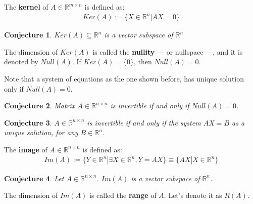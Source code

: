 \documentclass[aspectratio=169]{beamer}
\newtheorem{proposition}{Conjecture}[section]
\begin{document}
\begin{frame}
    \begin{definition}
        The \textbf{kernel} of $A\in\mathds{R}^{m\times n}$ is defined as:
        \begin{align*}
            Ker(A):=\{X\in\mathds{R}^n| AX = 0\}
        \end{align*}
    \end{definition}
    
    \begin{proposition}
        $Ker(A)\subseteq\mathds{R}^n$ is a vector subspace of $\mathds{R}^n$
    \end{proposition}
    
    \begin{definition}
        The dimension of $Ker(A)$ is called the \textbf{nullity} --- or nullspace ---, and it is denoted by $Null(A)$. If $Ker(A)=\{0\}$, then $Null(A)=0$.
    \end{definition}
    
    Note that a system of equations as the one shown before, has unique solution only if $Null(A)=0$.
    
\end{frame}

\begin{frame}
    \begin{proposition}
        Matrix $A\in\mathds{R}^{n\times n}$ is invertible if and only if $Null(A)=0$.
    \end{proposition}
    
    \begin{proposition}
        $A\in\mathds{R}^{n\times n}$ is invertible if and only if the system $AX=B$ as a unique solution, for any $B\in\mathds{R}^n$.
    \end{proposition}
    
\end{frame}

\begin{frame}
    \begin{definition}
        The \textbf{image} of $A\in\mathds{R}^{n\times n}$ is defined as:
        \begin{align*}
            Im(A):=\{Y\in\mathds{R}^n|\exists X\in\mathds{R}^n, Y=AX\}\equiv \{AX|X\in\mathds{R}^n\}
        \end{align*}
    \end{definition}
    
    \begin{proposition}
        Let $A\in\mathds{R}^{n\times n}$. $Im(A)$ is a vector subspace of $\mathds{R}^n$.
    \end{proposition}
    
    \begin{definition}
        The dimension of $Im(A)$ is called the \textbf{range} of $A$. Let's denote it as $R(A)$.
    \end{definition}
\end{frame}
\end{document}
